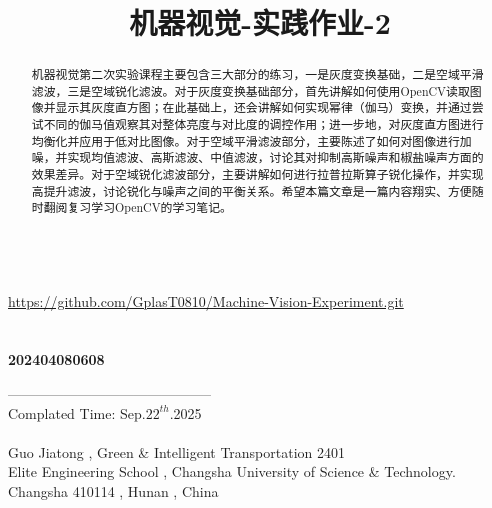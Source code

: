 \documentclass[11pt]{article}
\title{机器视觉-实践作业-2}
\begin{document}
    
    \maketitle
    
    \vspace*{4em}
    \begin{abstract}
    	机器视觉第二次实验课程主要包含三大部分的练习，一是灰度变换基础，二是空域平滑滤波，三是空域锐化滤波。对于灰度变换基础部分，首先讲解如何使用OpenCV读取图像并显示其灰度直方图；在此基础上，还会讲解如何实现幂律（伽马）变换，并通过尝试不同的伽马值观察其对整体亮度与对比度的调控作用；进一步地，对灰度直方图进行均衡化并应用于低对比图像。对于空域平滑滤波部分，主要陈述了如何对图像进行加噪，并实现均值滤波、高斯滤波、中值滤波，讨论其对抑制高斯噪声和椒盐噪声方面的效果差异。对于空域锐化滤波部分，主要讲解如何进行拉普拉斯算子锐化操作，并实现高提升滤波，讨论锐化与噪声之间的平衡关系。希望本篇文章是一篇内容翔实、方便随时翻阅复习学习OpenCV的学习笔记。
    \end{abstract}
    
    \begin{center}
    	\\\underline{https://github.com/GplasT0810/Machine-Vision-Experiment.git}\\
    	\\
    	\\
    	\vspace{0.7em}\textbf{{\large 202404080608}}\\
    \end{center}
    \newpage
    
    \tableofcontents
	    \begin{center}
		\vspace{9em}
	\end{center}
	
	\vspace*{10em}--------------------------------------------\\
	Complated Time: Sep.$22^{th}$.2025\\ \\
	Guo Jiatong , Green \& Intelligent Transportation 2401\\
	Elite Engineering School , Changsha University of Science \& Technology.\\
	Changsha 410114 , Hunan , China
	
\end{document}
